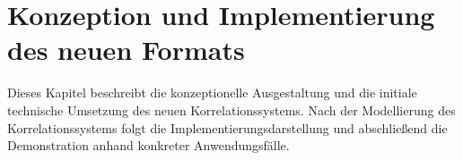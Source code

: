 \chapter{Konzeption und Implementierung des neuen Formats}\label{ch:modeling-implmentation}

Dieses Kapitel beschreibt die konzeptionelle Ausgestaltung und die initiale technische Umsetzung des neuen Korrelationssystems.
Nach der Modellierung des Korrelationssystems folgt die Implementierungsdarstellung und abschließend die Demonstration anhand konkreter Anwendungsfälle.






